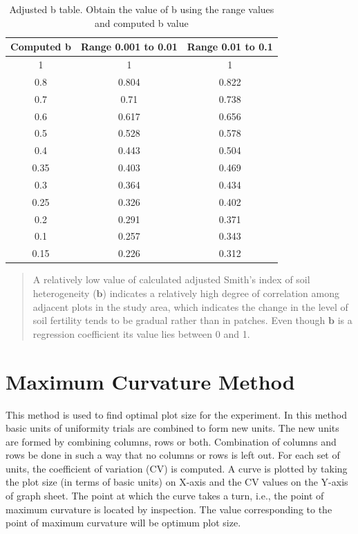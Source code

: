 \documentclass[
]{book}
\begin{document}
\begin{table}[H]
\centering\centering
\caption{\label{tab:ex3t1}Adjusted b table. Obtain the value of b using the range values and computed b value}
\centering
\begin{tabular}[t]{c|c|c}
\hline
Computed b & Range 0.001 to 0.01 & Range 0.01 to 0.1\\
\hline
1 & 1 & 1\\
\hline
0.8 & 0.804 & 0.822\\
\hline
0.7 & 0.71 & 0.738\\
\hline
0.6 & 0.617 & 0.656\\
\hline
0.5 & 0.528 & 0.578\\
\hline
0.4 & 0.443 & 0.504\\
\hline
0.35 & 0.403 & 0.469\\
\hline
0.3 & 0.364 & 0.434\\
\hline
0.25 & 0.326 & 0.402\\
\hline
0.2 & 0.291 & 0.371\\
\hline
0.1 & 0.257 & 0.343\\
\hline
0.15 & 0.226 & 0.312\\
\hline
\end{tabular}
\end{table}

\begin{quote}
A relatively low value of calculated adjusted Smith's index of soil
heterogeneity (\(\mathbf{b}\)) indicates a relatively high degree of
correlation among adjacent plots in the study area, which indicates
the change in the level of soil fertility tends to be gradual rather
than in patches. Even though \(\mathbf{b}\) is a regression coefficient
its value lies between 0 and 1.
\end{quote}

\hypertarget{mcm}{%
\section{Maximum Curvature Method}\label{mcm}}

This method is used to find optimal plot size for the experiment. In
this method basic units of uniformity trials are combined to form new
units. The new units are formed by combining columns, rows or both.
Combination of columns and rows be done in such a way that no columns or
rows is left out. For each set of units, the coefficient of variation
(CV) is computed. A curve is plotted by taking the plot size (in terms
of basic units) on X-axis and the CV values on the Y-axis of graph
sheet. The point at which the curve takes a turn, i.e., the point of
maximum curvature is located by inspection. The value corresponding to
the point of maximum curvature will be optimum plot size.
\end{document}
